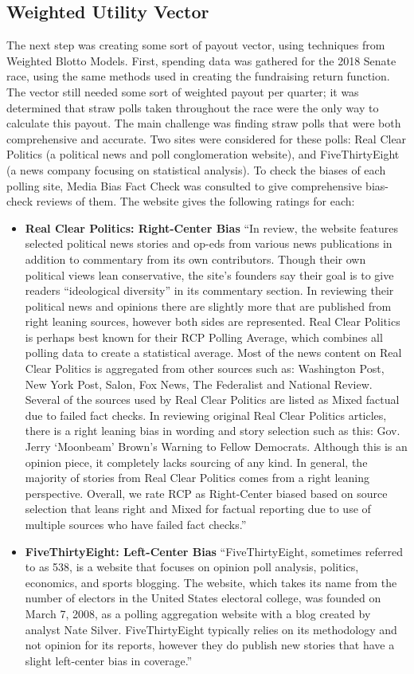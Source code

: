 \documentclass[11pt]{article}
\begin{document}
\subsection{Weighted Utility Vector}
The next step was creating some sort of payout vector, using techniques from
Weighted Blotto Models. First, spending data was gathered for the 2018 Senate
race, using the same methods used in creating the fundraising return
function. The vector still needed some sort of weighted payout per quarter; it
was determined that straw polls taken throughout the race were the only way to
calculate this payout. The main challenge was finding straw polls that were
both comprehensive and accurate. Two sites were considered for these polls:
Real Clear Politics \cite{realclearpolitics} (a political news and poll
conglomeration website), and FiveThirtyEight \cite{538} (a news company
focusing on statistical analysis). To check the biases of each polling site,
Media Bias Fact Check \cite{mediabias} was consulted to give comprehensive
bias-check reviews of them. The website gives the following ratings for each:
\begin{itemize}
\item \textbf{Real Clear Politics: Right-Center Bias} ``In review, the website
features selected political news stories and op-eds from various news
publications in addition to commentary from its own contributors. Though
their own political views lean conservative, the site’s founders say their
goal is to give readers “ideological diversity” in its commentary section. In
reviewing their political news and opinions there are slightly more that are
published from right leaning sources, however both sides are
represented. Real Clear Politics is perhaps best known for their RCP Polling
Average, which combines all polling data to create a statistical
average. Most of the news content on Real Clear Politics is aggregated from
other sources such as: Washington Post, New York Post, Salon, Fox News, The
Federalist and National Review. Several of the sources used by Real Clear
Politics are listed as Mixed factual due to failed fact checks. In reviewing
original Real Clear Politics articles, there is a right leaning bias in
wording and story selection such as this: Gov. Jerry ‘Moonbeam’ Brown’s
Warning to Fellow Democrats. Although this is an opinion piece, it completely
lacks sourcing of any kind. In general, the majority of stories from Real
Clear Politics comes from a right leaning perspective. Overall, we rate RCP
as Right-Center biased based on source selection that leans right and Mixed
for factual reporting due to use of multiple sources who have failed fact
checks.''
\item \textbf{FiveThirtyEight: Left-Center Bias} ``FiveThirtyEight, sometimes
referred to as 538, is a website that focuses on opinion poll analysis,
politics, economics, and sports blogging. The website, which takes its name
from the number of electors in the United States electoral college, was
founded on March 7, 2008, as a polling aggregation website with a blog
created by analyst Nate Silver. FiveThirtyEight typically relies on its
methodology and not opinion for its reports, however they do publish new
stories that have a slight left-center bias in coverage.''
\end{itemize}
\end{document}
